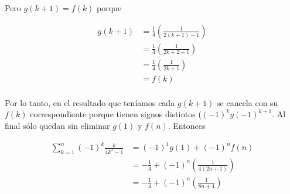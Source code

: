 \documentclass{article}
\begin{document}
Pero $g(k+1) = f(k)$ porque

\begin{align*}
g(k+1) & = \frac{1}{4} \left( \frac{1}{2(k+1)-1} \right) \\
       & = \frac{1}{4} \left( \frac{1}{2k+2-1} \right) \\
       & = \frac{1}{4} \left( \frac{1}{2k+1} \right) \\
       & = f(k) \\
\end{align*}

Por lo tanto, en el resultado que teníamos cada $g(k+1)$ se cancela con su $f(k)$ correspondiente
porque tienen signos distintos ($(-1)^k y (-1)^{k+1}$. Al final sólo quedan sin eliminar $g(1)$ y
$f(n)$. Entonces

\begin{align*}
\sum_{k=1}^n (-1)^k \frac{k}{4k^2-1} & = (-1)^1 g(1) + (-1)^n f(n) \\
                                     & = -\frac{1}{4} + (-1)^n \left( \frac{1}{4(2n+1)} \right) \\
                                     & = -\frac{1}{4} + (-1)^n \left( \frac{1}{8n+4} \right) \\
\end{align*}
\end{document}
